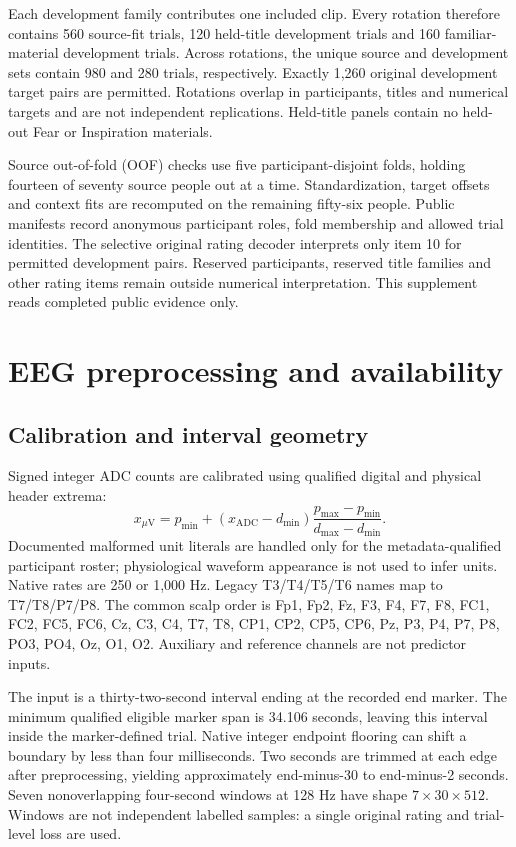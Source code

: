 \documentclass[11pt,a4paper]{article}
\begin{document}
Each development family contributes one included clip. Every rotation therefore contains 560 source-fit trials, 120 held-title development trials and 160 familiar-material development trials. Across rotations, the unique source and development sets contain 980 and 280 trials, respectively. Exactly 1,260 original development target pairs are permitted. Rotations overlap in participants, titles and numerical targets and are not independent replications. Held-title panels contain no held-out Fear or Inspiration materials.

Source out-of-fold (OOF) checks use five participant-disjoint folds, holding fourteen of seventy source people out at a time. Standardization, target offsets and context fits are recomputed on the remaining fifty-six people. Public manifests record anonymous participant roles, fold membership and allowed trial identities. The selective original rating decoder interprets only item 10 for permitted development pairs. Reserved participants, reserved title families and other rating items remain outside numerical interpretation. This supplement reads completed public evidence only.

\section{EEG preprocessing and availability}
\subsection{Calibration and interval geometry}
Signed integer ADC counts are calibrated using qualified digital and physical header extrema:
\[
x_{\mu\mathrm{V}}=p_{\min}+
(x_{\mathrm{ADC}}-d_{\min})\frac{p_{\max}-p_{\min}}{d_{\max}-d_{\min}}.
\]
Documented malformed unit literals are handled only for the metadata-qualified participant roster; physiological waveform appearance is not used to infer units. Native rates are 250 or 1,000 Hz. Legacy T3/T4/T5/T6 names map to T7/T8/P7/P8. The common scalp order is Fp1, Fp2, Fz, F3, F4, F7, F8, FC1, FC2, FC5, FC6, Cz, C3, C4, T7, T8, CP1, CP2, CP5, CP6, Pz, P3, P4, P7, P8, PO3, PO4, Oz, O1, O2. Auxiliary and reference channels are not predictor inputs.

The input is a thirty-two-second interval ending at the recorded end marker. The minimum qualified eligible marker span is 34.106 seconds, leaving this interval inside the marker-defined trial. Native integer endpoint flooring can shift a boundary by less than four milliseconds. Two seconds are trimmed at each edge after preprocessing, yielding approximately end-minus-30 to end-minus-2 seconds. Seven nonoverlapping four-second windows at 128 Hz have shape \(7\times30\times512\). Windows are not independent labelled samples: a single original rating and trial-level loss are used.
\end{document}
